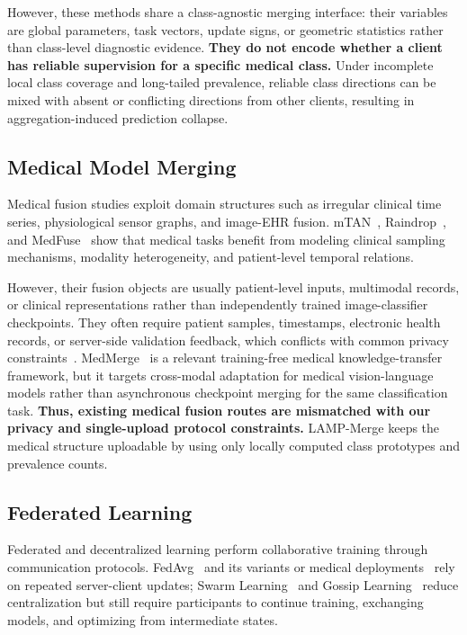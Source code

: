 \documentclass[letterpaper]{article} %
\begin{document}
However, these methods share a class-agnostic merging interface: their variables are global parameters, task vectors, update signs, or geometric statistics rather than class-level diagnostic evidence. \textbf{They do not encode whether a client has reliable supervision for a specific medical class.} Under incomplete local class coverage and long-tailed prevalence, reliable class directions can be mixed with absent or conflicting directions from other clients, resulting in aggregation-induced prediction collapse\cite{BUDA2018249,10.1371/journal.pmed.1002683}.

\subsection{Medical Model Merging}

Medical fusion studies exploit domain structures such as irregular clinical time series, physiological sensor graphs, and image-EHR fusion. mTAN~\cite{shukla2021multitimeattentionnetworksirregularly}, Raindrop~\cite{zhang2022graphguidednetworkirregularlysampled}, and MedFuse~\cite{hayat2023medfusemultimodalfusionclinical} show that medical tasks benefit from modeling clinical sampling mechanisms, modality heterogeneity, and patient-level temporal relations.

However, their fusion objects are usually patient-level inputs, multimodal records, or clinical representations rather than independently trained image-classifier checkpoints. They often require patient samples, timestamps, electronic health records, or server-side validation feedback, which conflicts with common privacy constraints~\cite{kaissis2020secure,sheller2020federated,bonawitz2019towards}. MedMerge~\cite{11382027} is a relevant training-free medical knowledge-transfer framework, but it targets cross-modal adaptation for medical vision-language models rather than asynchronous checkpoint merging for the same classification task. \textbf{Thus, existing medical fusion routes are mismatched with our privacy and single-upload protocol constraints.} LAMP-Merge keeps the medical structure uploadable by using only locally computed class prototypes and prevalence counts.

\subsection{Federated Learning}

Federated and decentralized learning perform collaborative training through communication protocols. FedAvg~\cite{pmlr-v54-mcmahan17a} and its variants or medical deployments~\cite{li2020fedprox,karimireddy2020scaffold,li2021fedbn,kaissis_secure_2020,sheller2020federated,rieke2020future,kairouz2021advances} rely on repeated server-client updates; Swarm Learning~\cite{warnat-herresthal_swarm_2021} and Gossip Learning~\cite{hegedhus_gossip_2019} reduce centralization but still require participants to continue training, exchanging models, and optimizing from intermediate states.
\end{document}
